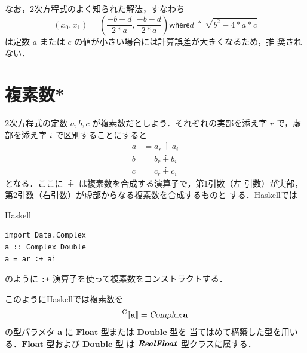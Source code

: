 \documentclass[a5paper,twoside,fleqn,draft]{jsbook}
\def\[{[\![}
\def\]{]\!]}
\newcommand{\programminglanguage}[1]{\textsf{#1}}
\newcommand{\haskell}{\programminglanguage{Haskell}}
\newcommand{\code}[1]{\texttt{#1}}
\newenvironment{haskellcode}{\begin{itembox}[r]{\haskell}}{\end{itembox}}
\newcommand{\mKeyword}[1]{\mathsf{#1}}
\newcommand{\mWhereKeyword}{\mKeyword{where}}
\DeclareMathOperator{\mComplexPlus}{\dotplus}
\DeclareMathOperator{\mLetEq}{\triangleq}
\newcommand{\mType}[1]{\mathbf{#1}} %
\newcommand{\mA}{\mType{a}}
\newcommand{\mFloatType}{\mType{Float}}
\newcommand{\mDoubleType}{\mType{Double}}
\newcommand{\mTypeAssemble}[2]{{}^\mathrm{#1}\[\mType{#2}\]}
\newcommand{\mCompFunclexType}[1]{\mTypeAssemble{C}{#1}} %
\newcommand{\mTypeConstructor}[1]{\textsl{#1}}
\newcommand{\mTypeClass}[1]{\textbf{\textit{#1}}}
\newcommand{\mRealFloatTypeClass}{\mTypeClass{RealFloat}}
\newcommand{\mWhereIsEXP}[2]{\mathbin{\mWhereKeyword}#1\mLetEq#2} %
\begin{document}
なお，2次方程式のよく知られた解法，すなわち
\begin{equation}
  (x_0,x_1)=\left(\frac{-b+d}{2*a},\frac{-b-d}{2*a}\right)
  \mWhereIsEXP{d}{\sqrt{b^2-4*a*c}}
\end{equation}
は定数 $a$ または $c$ の値が小さい場合には計算誤差が大きくなるため，推
奨されない．

\section{複素数*}


2次方程式の定数 $a,b,c$ が複素数だとしよう．それぞれの実部を添え字 $r$
で，虚部を添え字 $i$ で区別することにすると
\begin{align}
a&=a_r\mComplexPlus a_i\\
b&=b_r\mComplexPlus b_i\\
c&=c_r\mComplexPlus c_i
\end{align}
となる．ここに $\mComplexPlus$ は複素数を合成する演算子で，第1引数（左
  引数）が実部，第2引数（右引数）が虚部からなる複素数を合成するものと
する．\haskell では
\begin{haskellcode}
\begin{verbatim}
import Data.Complex
a :: Complex Double
a = ar :+ ai
\end{verbatim}
\end{haskellcode}
のように \code{:+} 演算子を使って複素数をコンストラクトする．

このように\haskell では複素数を
\begin{equation}
  \mCompFunclexType{a}=\mathop{\mTypeConstructor{Complex}}\mA
\end{equation}
の型パラメタ $\mA $ に $\mFloatType$ 型または $\mDoubleType$ 型を
当てはめて構築した型を用いる．$\mFloatType$ 型および $\mDoubleType$ 型
は $\mRealFloatTypeClass$ 型クラスに属する．
\end{document}
